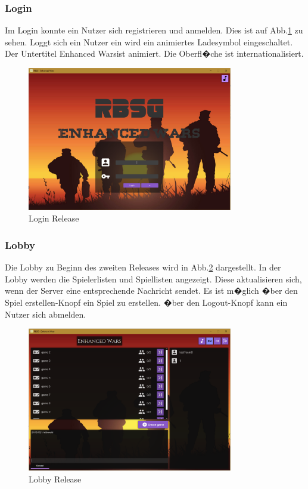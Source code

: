 \documentclass[12pt, titlepage]{scrartcl}
\newcommand{\RN}[1]{%
	\textup{\uppercase\expandafter{\romannumeral#1}}%
}
\begin{document}
		\subsubsection{Login}
			Im Login konnte ein Nutzer sich registrieren und anmelden. Dies ist auf Abb.\ref{Login_Release_One} zu sehen. Loggt sich ein Nutzer ein wird ein animiertes Ladesymbol eingeschaltet. Der Untertitel \glqq Enhanced Wars\grqq ist animiert. Die Oberfl�che ist internationalisiert.
			\begin{figure}[H] 
				\centering
				\includegraphics[width=0.8\textwidth]{Login_Release_One.PNG}
				\caption{Login Release \RN{1}}
				\label{Login_Release_One}
			\end{figure}
		\subsubsection{Lobby}
		Die Lobby zu Beginn des zweiten Releases wird in Abb.\ref{Lobby_Release_One} dargestellt. In der Lobby werden die Spielerlisten und Spiellisten angezeigt. Diese aktualisieren sich, wenn der Server eine entsprechende Nachricht sendet. Es ist m�glich �ber den \glqq Spiel erstellen\grqq-Knopf ein Spiel zu erstellen. �ber den \glqq Logout\grqq-Knopf kann ein Nutzer sich abmelden.
		\begin{figure}[H] 
			\centering
			\includegraphics[width=0.8\textwidth]{Lobby_Release_One.PNG}
			\caption{Lobby Release \RN{1}}
			\label{Lobby_Release_One}
		\end{figure}
\end{document}
